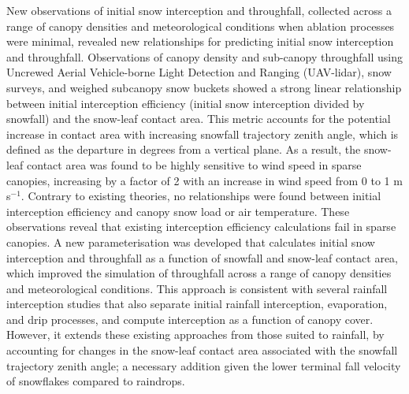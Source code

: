 {New observations of initial snow interception and throughfall, collected across a range of canopy densities and meteorological conditions when ablation processes were minimal, revealed new relationships for predicting initial snow interception and throughfall. Observations of canopy density and sub-canopy throughfall using Uncrewed Aerial Vehicle-borne Light Detection and Ranging (UAV-lidar), snow surveys, and weighed subcanopy snow buckets showed a strong linear relationship between initial interception efficiency (initial snow interception divided by snowfall) and the snow-leaf contact area. This metric accounts for the potential increase in contact area with increasing snowfall trajectory zenith angle, which is defined as the departure in degrees from a vertical plane. As a result, the snow-leaf contact area was found to be highly sensitive to wind speed in sparse canopies, increasing by a factor of 2 with an increase in wind speed from 0 to 1 m s$^{-1}$. Contrary to existing theories, no relationships were found between initial interception efficiency and canopy snow load or air temperature. These observations reveal that existing interception efficiency calculations fail in sparse canopies. A new parameterisation was developed that calculates initial snow interception and throughfall as a function of snowfall and snow-leaf contact area, which improved the simulation of throughfall across a range of canopy densities and meteorological conditions. This approach is consistent with several rainfall interception studies that also separate initial rainfall interception, evaporation, and drip processes, and compute interception as a function of canopy cover. However, it extends these existing approaches from those suited to rainfall, by accounting for changes in the snow-leaf contact area associated with the snowfall trajectory zenith angle; a necessary addition given the lower terminal fall velocity of snowflakes compared to raindrops.

}
